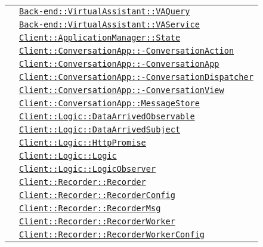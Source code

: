 \begin{longtable}{|>{\centering}m{3cm}|m{10cm}<{\centering}|}
& \hyperref[Back-end::VirtualAssistant::VAQuery]{\texttt{Back-end::VirtualAssistant::VAQuery}}\\
& \hyperref[Back-end::VirtualAssistant::VAService]{\texttt{Back-end::VirtualAssistant::VAService}}\\
& \hyperref[Client::ApplicationManager::State]{\texttt{Client::ApplicationManager::State}}\\
& \hyperref[Client::ConversationApp::ConversationAction]{\texttt{Client::ConversationApp::-\linebreak ConversationAction}}\\
& \hyperref[Client::ConversationApp::ConversationApp]{\texttt{Client::ConversationApp::-\linebreak ConversationApp}}\\
& \hyperref[Client::ConversationApp::ConversationDispatcher]{\texttt{Client::ConversationApp::-\linebreak ConversationDispatcher}}\\
& \hyperref[Client::ConversationApp::ConversationView]{\texttt{Client::ConversationApp::-\linebreak ConversationView}}\\
& \hyperref[Client::ConversationApp::MessageStore]{\texttt{Client::ConversationApp::MessageStore}}\\
& \hyperref[Client::Logic::DataArrivedObservable]{\texttt{Client::Logic::DataArrivedObservable}}\\
& \hyperref[Client::Logic::DataArrivedSubject]{\texttt{Client::Logic::DataArrivedSubject}}\\
& \hyperref[Client::Logic::HttpPromise]{\texttt{Client::Logic::HttpPromise}}\\
& \hyperref[Client::Logic::Logic]{\texttt{Client::Logic::Logic}}\\
& \hyperref[Client::Logic::LogicObserver]{\texttt{Client::Logic::LogicObserver}}\\
& \hyperref[Client::Recorder::Recorder]{\texttt{Client::Recorder::Recorder}}\\
& \hyperref[Client::Recorder::RecorderConfig]{\texttt{Client::Recorder::RecorderConfig}}\\
& \hyperref[Client::Recorder::RecorderMsg]{\texttt{Client::Recorder::RecorderMsg}}\\
& \hyperref[Client::Recorder::RecorderWorker]{\texttt{Client::Recorder::RecorderWorker}}\\
& \hyperref[Client::Recorder::RecorderWorkerConfig]{\texttt{Client::Recorder::RecorderWorkerConfig}}\\

\end{longtable}
